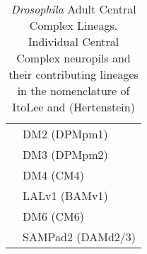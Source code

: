 \begin{table}[ht]
\begin{tabular}{l|l}
                & DM2 (DPMpm1) \\
                & DM3 (DPMpm2) \\
                & DM4 (CM4) \\
                & LALv1 (BAMv1) \\
                & DM6 (CM6) \\
                & SAMPad2 (DAMd2/3) \\
            \bottomrule
        \end{tabular}
        \caption[\textit{Drosophila} Adult Central Complex Lineags]{\textit{Drosophila} Adult Central Complex Lineags. Individual Central Complex neuropils and their contributing lineages in the nomenclature of ItoLee\citep{lai2008clonal} and (Hertenstein)\citep{lovick2013postembryonic}}
        \label{adultlineages}
        \end{table}

    


